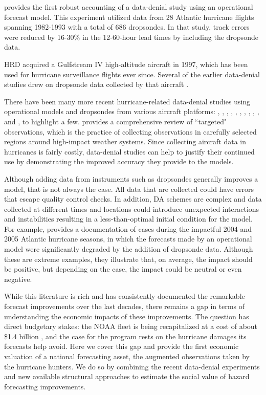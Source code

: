 \documentclass[12pt]{article}%
\begin{document}
\citet{BurpeeEA1996} provides the first robust accounting of a data-denial study using an operational forecast model. This experiment utilized data from 28 Atlantic hurricane flights spanning 1982-1993 with a total of 686 dropsondes. In that study, track errors were reduced by 16-30\% in the 12-60-hour lead times by including the dropsonde data.

HRD acquired a Gulfstream IV high-altitude aircraft in 1997, which has been used for hurricane surveillance flights ever since. Several of the earlier data-denial studies drew on dropsonde data collected by that aircraft \citep{Aberson_Franklin1999, Aberson2002, Aberson2010}.

There have been many more recent hurricane-related data-denial studies using operational models and dropsondes from various aircraft platforms: \citet{Aberson2011}, \citet{ChouEA2011}, \citet{MajumdarEA2013}, \citet{ChristophersonEA2017}, \citet{ChristophersonEA2018}, \citet{KrenEA2018}, \citet{TongEA2018}, \citet{AksoyEA2022}, \citet{SippelEA2022}, \citet{DitchekEA2023}, and \citet{SippelEA2026}, to highlight a few. \citet{Majumdar2016} provides a comprehensive review of ``targeted" observations, which is the practice of collecting observations in carefully selected regions around high-impact weather systems. Since collecting aircraft data in hurricanes is fairly costly, data-denial studies can help to justify their continued use by demonstrating the improved accuracy they provide to the models.

Although adding data from instruments such as dropsondes generally improves a model, that is not always the case. All data that are collected could have errors that escape quality control checks. In addition, DA schemes are complex and data collected at different times and locations could introduce unexpected interactions and instabilities resulting in a less-than-optimal initial condition for the model. For example, \citet{Aberson2008} provides a documentation of cases during the impactful 2004 and 2005 Atlantic hurricane seasons, in which the forecasts made by an operational model were significantly degraded by the addition of dropsonde data. Although these are extreme examples, they illustrate that, on average, the impact should be positive, but depending on the case, the impact could be neutral or even negative.

While this literature is rich and has consistently documented the remarkable forecast improvements over the last decades, there remains a gap in terms of understanding the economic impacts of these improvements. The question has direct budgetary stakes: the NOAA fleet is being recapitalized at a cost of about \$1.4 billion \citep{GAO2025HurricaneHunter}, and the case for the program rests on the hurricane damages its forecasts help avoid. Here we cover this gap and provide the first economic valuation of a national forecasting asset, the augmented observations taken by the hurricane hunters. We do so by combining the recent data-denial experiments and new available structural approaches to estimate the social value of hazard forecasting improvements. 
\end{document}
